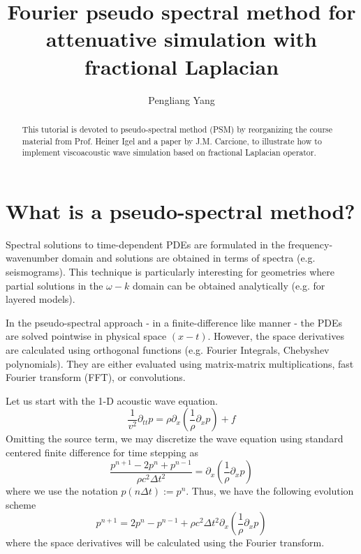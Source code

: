 \title{Fourier pseudo spectral method for attenuative simulation with fractional Laplacian}

\author{Pengliang Yang}




\maketitle


\begin{abstract}
This tutorial is devoted to pseudo-spectral method (PSM) by reorganizing the course material from Prof. Heiner Igel and a paper by J.M. Carcione, to illustrate how to implement viscoacoustic wave simulation based on fractional Laplacian operator. 
\end{abstract}

\section{What is a pseudo-spectral method?}


Spectral solutions to time-dependent PDEs are formulated in the frequency-wavenumber domain and solutions are obtained in terms of spectra (e.g. seismograms). This
technique is particularly interesting for geometries where partial solutions in the $\omega-k$ domain can be obtained analytically (e.g. for layered models).

In the pseudo-spectral approach - in a finite-difference like manner - the PDEs are solved pointwise in physical space $(x-t)$. However, the space derivatives are calculated using
orthogonal functions (e.g. Fourier Integrals, Chebyshev polynomials). They are either evaluated using matrix-matrix multiplications, fast Fourier transform (FFT), or convolutions.

Let us start with the 1-D acoustic wave equation.
\begin{equation}
 \frac{1}{v^2}\partial_{tt}p=\rho\partial_x\left(\frac{1}{\rho}\partial_x p\right)+f
\end{equation}
Omitting the source term, we may discretize the wave equation using standard centered finite difference for time stepping as
\begin{equation} 
\frac{p^{n+1}-2p^n+p^{n-1}}{\rho c^2\Delta t^2}=\partial_x\left(\frac{1}{\rho}\partial_x p\right)
\end{equation}
where we use the notation $p(n\Delta t):=p^n$. Thus, we have the following evolution scheme
\begin{equation}
 p^{n+1}=2p^n-p^{n-1}+\rho c^2\Delta t^2 \partial_x\left(\frac{1}{\rho}\partial_x p\right)
\end{equation}
where the space derivatives will be calculated using the Fourier transform.

